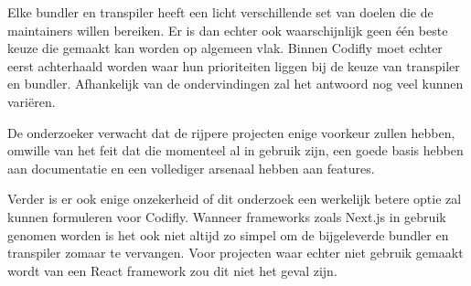Elke bundler en transpiler heeft een licht verschillende set van doelen die de maintainers willen bereiken. Er is dan echter ook waarschijnlijk geen één beste keuze die gemaakt kan worden op algemeen vlak. Binnen Codifly moet echter eerst achterhaald worden waar hun prioriteiten liggen bij de keuze van transpiler en bundler. Afhankelijk van de ondervindingen zal het antwoord nog veel kunnen variëren. 

De onderzoeker verwacht dat de rijpere projecten enige voorkeur zullen hebben, omwille van het feit dat die momenteel al in gebruik zijn, een goede basis hebben aan documentatie en een vollediger arsenaal hebben aan features.

Verder is er ook enige onzekerheid of dit onderzoek een werkelijk betere optie zal kunnen formuleren voor Codifly. Wanneer frameworks zoals Next.js in gebruik genomen worden is het ook niet altijd zo simpel om de bijgeleverde bundler en transpiler zomaar te vervangen. Voor projecten waar echter niet gebruik gemaakt wordt van een React framework zou dit niet het geval zijn.
